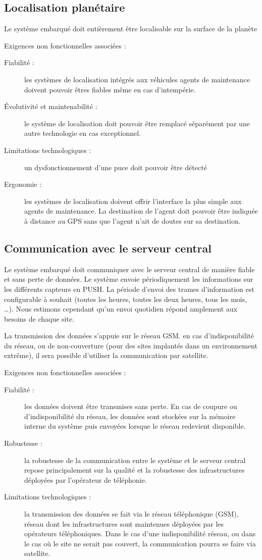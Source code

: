 \documentclass{mise_en_page}
\begin{document}
\subsection{Localisation planétaire}
Le système embarqué doit entièrement être localisable sur la surface de
la planète

Exigences non fonctionnelles associées :

\begin{description}
\item[Fiabilité :] les systèmes de localisation intégrés aux véhicules
agents de maintenance doivent pouvoir êtres fiables même en cas
d’intempérie.
\item[Évolutivité et maintenabilité :] le système de localisation doit
pouvoir être remplacé séparément par une autre technologie en cas
exceptionnel.
\item[Limitations technologiques :] un dysfonctionnement d’une puce doit
pouvoir être détecté
\item[Ergonomie :] les systèmes de localisation doivent offrir
l’interface la plus simple aux agents de maintenance. La destination de
l’agent doit pouvoir être indiquée à distance au GPS sans que l’agent
n’ait de doutes sur sa destination.
\end{description}
\subsection{Communication avec le serveur central}
Le système embarqué doit communiquer avec le serveur central de manière
fiable et sans perte de données. Le système envoie périodiquement les
informations sur les différents capteurs en PUSH. La période d’envoi
des trames d’information est configurable à souhait (toutes les heures,
toutes les deux heures, tous les mois, …). Nous estimons cependant
qu’un envoi quotidien répond amplement aux besoins de chaque site. 

La transmission des données s’appuie sur le réseau GSM. en cas
d’indisponibilité du réseau, ou de non-couverture (pour des sites
implantés dans un environnement extrême), il sera possible d’utiliser
la communication par satellite.

Exigences non fonctionnelles associées : 

\begin{description}
\item[Fiabilité :] les données doivent être transmises sans perte. En cas
de coupure ou d’indisponibilité du réseau, les données sont stockées
sur la mémoire interne du système puis envoyées lorsque le réseau
redevient disponible.
\item[Robustesse :] la robustesse de la communication entre le système et
le serveur central repose principalement sur la qualité et la
robustesse des infrastructures déployées par l’opérateur de téléphonie.

\item[Limitations technologiques :] la transmission des données se fait
via le réseau téléphonique (GSM), réseau dont les infrastructures sont
maintenues déployées par les opérateurs téléphoniques. Dans le cas
d’une indisponibilité réseau, ou dans le cas où le site ne serait pas
couvert, la communication pourra se faire via satellite.  
\end{description}
\end{document}
